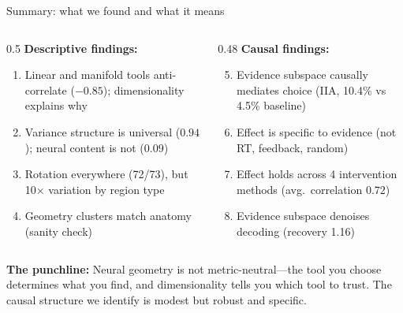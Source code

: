 \documentclass[aspectratio=169,11pt]{beamer}
\begin{document}
\begin{frame}{Summary: what we found and what it means}
\begin{columns}[T]
\begin{column}{0.5\textwidth}
\textbf{Descriptive findings:}
\begin{enumerate}
  \item Linear and manifold tools anti-correlate ($-0.85$); dimensionality explains why
  \item Variance structure is universal ($0.94$); neural content is not ($0.09$)
  \item Rotation everywhere (72/73), but 10$\times$ variation by region type
  \item Geometry clusters match anatomy (sanity check)
\end{enumerate}
\end{column}
\begin{column}{0.48\textwidth}
\textbf{Causal findings:}
\begin{enumerate}
  \setcounter{enumi}{4}
  \item Evidence subspace causally mediates choice (IIA, 10.4\% vs 4.5\% baseline)
  \item Effect is specific to evidence (not RT, feedback, random)
  \item Effect holds across 4 intervention methods (avg.\ correlation $0.72$)
  \item Evidence subspace denoises decoding (recovery 1.16)
\end{enumerate}
\end{column}
\end{columns}

\vspace{0.8em}
\textbf{The punchline:} Neural geometry is not metric-neutral---the tool you choose determines what you find, and dimensionality tells you which tool to trust. The causal structure we identify is modest but robust and specific.
\end{frame}
\end{document}
